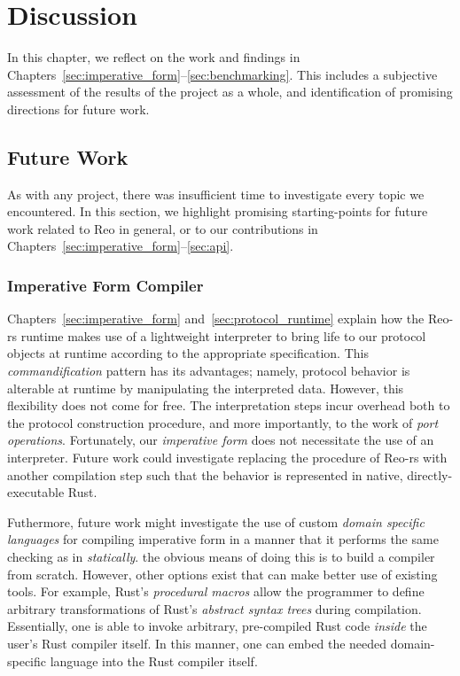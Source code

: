 \chapter{Discussion}
In this chapter, we reflect on the work and findings in Chapters~\ref{sec:imperative_form}--\ref{sec:benchmarking}. This includes a subjective assessment of the results of the project as a whole, and identification of promising directions for future work.

\label{sec:discussion}
\section{Future Work}
As with any project, there was insufficient time to investigate every topic we encountered. In this section, we highlight promising starting-points for future work related to Reo in general, or to our contributions in Chapters~\ref{sec:imperative_form}--\ref{sec:api}.

\subsection{Imperative Form Compiler}
Chapters~\ref{sec:imperative_form} and~\ref{sec:protocol_runtime} explain how the Reo-rs runtime makes use of a lightweight interpreter to bring life to our protocol objects at runtime according to the appropriate specification. This \textit{commandification} pattern has its advantages; namely, protocol behavior is alterable at runtime by manipulating the interpreted data. However, this flexibility does not come for free. The interpretation steps incur overhead both to the protocol construction procedure, and more importantly, to the work of \textit{port operations}. Fortunately, our \textit{imperative form} does not necessitate the use of an interpreter. Future work could investigate replacing the  procedure of Reo-rs with another compilation step such that the behavior is represented in native, directly-executable Rust. 

Futhermore, future work might investigate the use of custom \textit{domain specific languages} for compiling imperative form in a manner that it performs the same checking as in  \textit{statically}. the obvious means of doing this is to build a compiler from scratch. However, other options exist that can make better use of existing tools. For example, Rust's \textit{procedural macros} allow the programmer to define arbitrary transformations of Rust's \textit{abstract syntax trees} during compilation. Essentially, one is able to invoke arbitrary, pre-compiled Rust code \textit{inside} the user's Rust compiler itself. In this manner, one can embed the needed domain-specific language into the Rust compiler itself.

